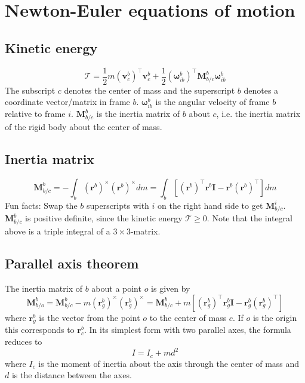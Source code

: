 \section{Newton-Euler equations of motion}
\subsection{Kinetic energy}
\begin{equation}
    \mathcal{T} = \frac{1}{2} m (\mathbf{v}_c^b)^\top \mathbf{v}_c^b +  \frac{1}{2} (\boldsymbol{\omega}_{ib}^b)^\top \mathbf{M}_{b/c}^b \boldsymbol{\omega}_{ib}^b
\end{equation}
The subscript $c$ denotes the center of mass and the superscript $b$ denotes a coordinate vector/matrix in frame $b$. $\boldsymbol{\omega}_{ib}^b$ is the angular velocity of frame $b$ relative to frame $i$. $\mathbf{M}_{b/c}^b$ is the inertia matrix of $b$ about $c$, i.e. the inertia matrix of the rigid body about the center of mass.

\subsection{Inertia matrix}
\begin{equation}
    \mathbf{M}_{b/c}^b = -\int_b (\mathbf{r}^b)^\times (\mathbf{r}^b)^\times dm = \int_b \left[ (\mathbf{r}^b)^\top \mathbf{r}^b \mathbf{I} - \mathbf{r}^b (\mathbf{r}^b)^\top \right] dm
\end{equation}
Fun facts: Swap the $b$ superscripts with $i$ on the right hand side to get $\mathbf{M}_{b/c}^i$. $\mathbf{M}_{b/c}^b$ is positive definite, since the kinetic energy $\mathcal{T} \geq 0$. Note that the integral above is a triple integral of a $3 \times 3$-matrix.

\subsection{Parallel axis theorem}
The inertia matrix of $b$ about a point $o$ is given by
\begin{equation}
    \mathbf{M}_{b/o}^b = \mathbf{M}_{b/c}^b - m (\mathbf{r}_g^b)^\times (\mathbf{r}_g^b)^\times =
    \mathbf{M}_{b/c}^b + m\left[ (\mathbf{r}_g^b)^\top \mathbf{r}_g^b \mathbf{I} - \mathbf{r}_g^b (\mathbf{r}_g^b)^\top \right]
\end{equation}
where $\mathbf{r}_g^b$ is the vector from the point $o$ to the center of mass $c$. If $o$ is the origin this corresponds to $\mathbf{r}_c^b$. In its simplest form with two parallel axes, the formula reduces to
\begin{equation}
    I = I_c + md^2
\end{equation}
where $I_c$ is the moment of inertia about the axis through the center of mass and $d$ is the distance between the axes.
